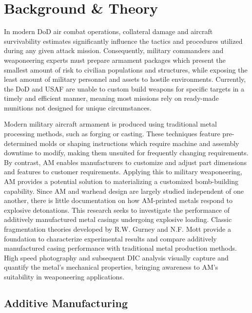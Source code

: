 \chapter{Background \& Theory} \label{chap:2}
 
In modern \gls{DoD} air combat operations, collateral damage and aircraft survivability estimates significantly influence the tactics and procedures utilized during any given attack mission. Consequently, military commanders and weaponeering experts must prepare armament packages which present the smallest amount of risk to civilian populations and structures, while exposing the least amount of military personnel and assets to hostile environments. Currently, the \gls{DoD} and \gls{USAF} are unable to custom build weapons for specific targets in a timely and efficient manner, meaning most missions rely on ready-made munitions not designed for unique circumstances. 

Modern military aircraft armament is produced using traditional metal processing methods, such as forging or casting. These techniques feature pre-determined molds or shaping instructions which require machine and assembly downtime to modify, making them unsuited for frequently changing requirements. By contrast, \gls{AM} enables manufacturers to customize and adjust part dimensions and features to customer requirements. Applying this to military weaponeering, \gls{AM} provides a potential solution to materializing a customized bomb-building capability. Since \gls{AM} and warhead design are largely studied independent of one another, there is little documentation on how \gls{AM}-printed metals respond to explosive detonations. This research seeks to investigate the performance of additively manufactured metal casings undergoing explosive loading. Classic fragmentation theories developed by R.W. Gurney and N.F. Mott provide a foundation to characterize experimental results and compare additively manufactured casing performance with traditional metal production methods. High speed photography and subsequent \gls{DIC} analysis visually capture and quantify the metal's mechanical properties, bringing awareness to \gls{AM}'s suitability in weaponeering applications.



\section{Additive Manufacturing} \label{sec:2_AdditiveManufacturing}

